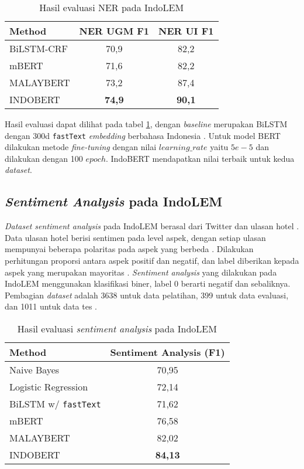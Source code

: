 \begin{table}[h]
    \vspace{0.25cm}
    \centering
    \caption{Hasil evaluasi NER pada IndoLEM}
    \label{table:indolem-ner-result}
    \begin{tabular}{lcc}
        \toprule
        \textbf{Method} & \textbf{NER UGM F1} & \textbf{NER UI F1} \\
        \midrule
        BiLSTM-CRF & 70,9 & 82,2 \\
        mBERT & 71,6 & 82,2 \\
        MALAYBERT & 73,2 & 87,4 \\
        INDOBERT & \textbf{74,9} & \textbf{90,1} \\
        \bottomrule 
    \end{tabular}
\end{table}

Hasil evaluasi dapat dilihat pada tabel \ref{table:indolem-ner-result}, dengan \textit{baseline} merupakan BiLSTM dengan 300d \texttt{fastText} \textit{embedding} berbahasa Indonesia \parencite{indolem}. Untuk model BERT dilakukan metode \textit{fine-tuning} dengan nilai $learning\_rate$ yaitu $5e-5$ dan dilakukan dengan 100 $epoch$. IndoBERT mendapatkan nilai terbaik untuk kedua \textit{dataset}.

\subsection{\textit{Sentiment Analysis} pada IndoLEM}

\textit{Dataset sentiment analysis} pada IndoLEM berasal dari Twitter dan ulasan hotel \parencite{indolem}. Data ulasan hotel berisi sentimen pada level aspek, dengan setiap ulasan mempunyai beberapa polaritas pada aspek yang berbeda \parencite{indolem}. Dilakukan perhitungan proporsi antara aspek positif dan negatif, dan label diberikan kepada aspek yang merupakan mayoritas \parencite{indolem}. \textit{Sentiment analysis} yang dilakukan pada IndoLEM menggunakan klasifikasi biner, label 0 berarti negatif dan sebaliknya. Pembagian \textit{dataset} adalah 3638 untuk data pelatihan, 399 untuk data evaluasi, dan 1011 untuk data tes \parencite{indolem}. 

\begin{table}[h]
    \vspace{0.25cm}
    \centering
    \caption{Hasil evaluasi \textit{sentiment analysis} pada IndoLEM}
    \label{table:indolem-sentiment-result}
    \begin{tabular}{lc}
        \toprule
        \textbf{Method} & \textbf{Sentiment Analysis (F1)} \\
        \midrule
        Naive Bayes & 70,95 \\
        Logistic Regression & 72,14 \\
        BiLSTM w/ \texttt{fastText} & 71,62 \\
        mBERT & 76,58 \\
        MALAYBERT & 82,02 \\
        INDOBERT & \textbf{84,13} \\
        \bottomrule
    \end{tabular}
\end{table}

